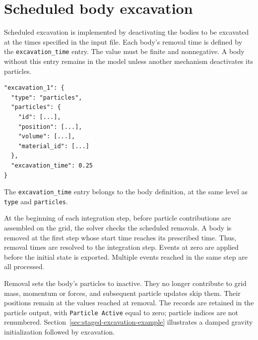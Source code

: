 \clearpage
\section{Scheduled body excavation}
\label{sec:scheduled-excavation}

Scheduled excavation is implemented by deactivating the bodies to be excavated at the times specified in the input file. Each body's removal time is defined by the \texttt{excavation\_time} entry. The value must be finite and nonnegative. A body without this entry remains in the model unless another mechanism deactivates its particles.

\begin{lstlisting}
"excavation_1": {
  "type": "particles",
  "particles": {
    "id": [...],
    "position": [...],
    "volume": [...],
    "material_id": [...]
  },
  "excavation_time": 0.25
}
\end{lstlisting}
The \texttt{excavation\_time} entry belongs to the body definition, at the same level as \texttt{type} and \texttt{particles}. 

At the beginning of each integration step, before particle contributions are assembled on the grid, the solver checks the scheduled removals. A body is removed at the first step whose start time reaches its prescribed time. Thus, removal times are resolved to the integration step. Events at zero are applied before the initial state is exported. Multiple events reached in the same step are all processed.

Removal sets the body's particles to inactive. They no longer contribute to grid mass, momentum or forces, and subsequent particle updates skip them. Their positions remain at the values reached at removal. The records are retained in the particle output, with \texttt{Particle Active} equal to zero; particle indices are not renumbered. Section~\ref{sec:staged-excavation-example} illustrates a damped gravity initialization followed by excavation.
